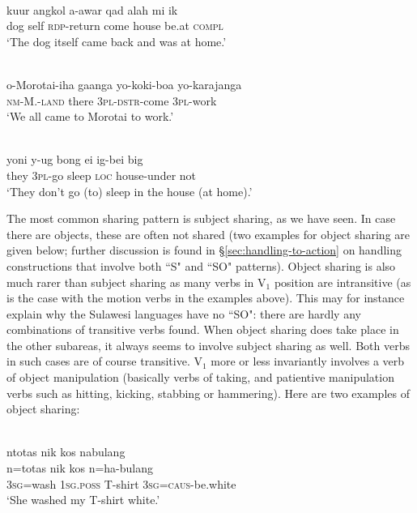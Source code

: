 \ea \label{}
\\
\gll kuur angkol a-awar qad alah mi ik \\
dog self \textsc{rdp}-return come house be.at \textsc{compl} \\
\glft `The dog itself came back and was at home.'\\ 
\z

\ea \label{tobelo001}
\\
\gll o-Morotai-iha gaanga yo-koki-boa yo-karajanga \\
\textsc{nm}-M.-\textsc{land} there 3\textsc{pl}-\textsc{dstr}-come 3\textsc{pl}-work \\
\glft `We all came to Morotai to work.'\\
\z

\ea \label{}
\\
\gll yoni y-ug bong ei ig-bei big \\
they 3\textsc{pl}-go sleep \textsc{loc} house-under not \\
\glft `They don't go (to) sleep in the house (at home).'\\ 
\z

The most common sharing pattern is subject sharing, as we have seen. In case there are objects, these are often not shared (two examples for object sharing are given below; further discussion is found in §\ref{sec:handling-to-action} on handling constructions that involve both ``S" and ``SO" patterns). Object sharing is also much rarer than subject sharing as many verbs in V$_1$ position are intransitive (as is the case with the motion verbs in the examples above). This may for instance explain why the Sulawesi languages have no ``SO": there are hardly any combinations of transitive verbs found. When object sharing does take place in the other subareas, it always seems to involve subject sharing as well. Both verbs in such cases are of course transitive. V$_1$ more or less invariantly involves a verb of object manipulation (basically verbs of taking, and patientive manipulation verbs such as hitting, kicking, stabbing or hammering). Here are two examples of object sharing:

\ea \label{taba001}
\\
\glll ntotas nik kos nabulang \\
n=totas nik kos n=ha-bulang \\
3\textsc{sg}=wash 1\textsc{sg}.\textsc{poss} T-shirt 3\textsc{sg}=\textsc{caus}-be.white \\
\glft `She washed my T-shirt white.'\\ 
\z

